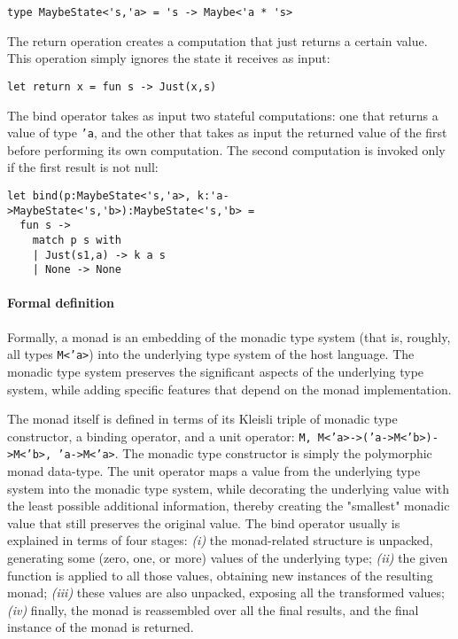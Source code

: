 \begin{lstlisting}
type MaybeState<'s,'a> = 's -> Maybe<'a * 's>
\end{lstlisting}

The return operation creates a computation that just returns a certain value. This operation simply ignores the state it receives as input:

\begin{lstlisting}
let return x = fun s -> Just(x,s)
\end{lstlisting}

The bind operator takes as input two stateful computations: one that returns a value of type \texttt{'a}, and the other that takes as input the returned value of the first before performing its own computation. The second computation is invoked only if the first result is not null:

\begin{lstlisting}
let bind(p:MaybeState<'s,'a>, k:'a->MaybeState<'s,'b>):MaybeState<'s,'b> =
  fun s ->
    match p s with
    | Just(s1,a) -> k a s
    | None -> None
\end{lstlisting}

\paragraph{Formal definition}
Formally, a monad is an embedding of the monadic type system (that is, roughly, all types \texttt{M<'a>}) into the underlying type system of the host language. The monadic type system preserves the significant aspects of the underlying type system, while adding specific features that depend on the monad implementation.

The monad itself is defined in terms of its Kleisli triple of monadic type constructor, a binding operator, and a unit operator: \texttt{M, M<'a>->('a->M<'b>)->M<'b>, 'a->M<'a>}. The monadic type constructor is simply the polymorphic monad data-type. The unit operator maps a value from the underlying type system into the monadic type system, while decorating the underlying value with the least possible additional information, thereby creating the "smallest" monadic value that still preserves the original value. The bind operator usually is explained in terms of four stages: \textit{(i)} the monad-related structure is unpacked, generating some (zero, one, or more) values of the underlying type; \textit{(ii)} the given function is applied to all those values, obtaining new instances of the resulting monad; \textit{(iii)} these values are also unpacked, exposing all the transformed values; \textit{(iv)} finally, the monad is reassembled over all the final results, and the final instance of the monad is returned.

